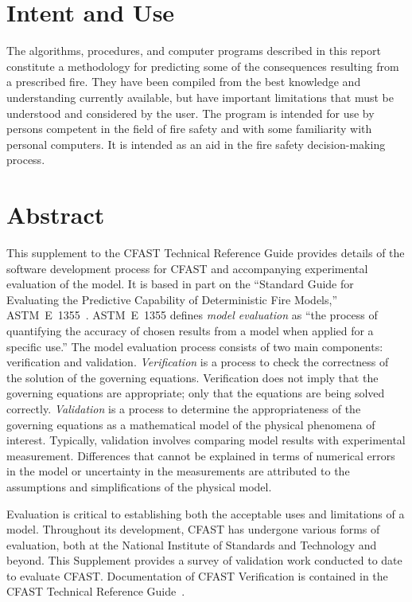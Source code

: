 \documentclass[12pt]{book}
\begin{document}
\chapter{Intent and Use}

The algorithms, procedures, and computer programs described in this report constitute a
methodology for predicting some of the consequences resulting from a prescribed fire.  They
have been compiled from the best knowledge and understanding currently available, but have
important limitations that must be understood and considered by the user.  The program is
intended for use by persons competent in the field of fire safety and with some familiarity with
personal computers. It is intended as an aid in the fire safety decision-making process.

\chapter{Abstract}

This supplement to the CFAST Technical Reference Guide provides details of the software development process for CFAST and accompanying experimental evaluation of the model. It is based in part on the ``Standard Guide for Evaluating the Predictive Capability of Deterministic Fire Models,'' ASTM~E~1355~\cite{ASTM:E1355}. ASTM~E~1355 defines {\em model evaluation} as ``the process of quantifying the accuracy of chosen results from a model when applied for a specific use.'' The model evaluation process consists of two main components: verification and validation. {\em Verification} is a process to check the correctness of the solution of the governing equations. Verification does not imply that the governing equations are appropriate; only that the equations are being solved correctly. {\em Validation} is a process to determine the appropriateness of the governing equations as a mathematical model of the physical phenomena of interest. Typically, validation involves comparing model results with experimental measurement. Differences that cannot be explained in terms of numerical errors in the model or uncertainty in the measurements are attributed to the assumptions and simplifications of the physical model.

Evaluation is critical to establishing both the acceptable uses and limitations of a model. Throughout its development, CFAST has undergone various forms of evaluation, both at the National Institute of Standards and Technology and beyond. This Supplement provides a survey of validation work conducted to date to evaluate CFAST. Documentation of CFAST Verification is contained in the CFAST Technical Reference Guide~\cite{CFAST_Tech_Guide_6}.
\end{document}
